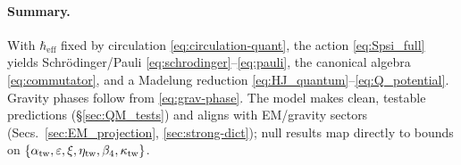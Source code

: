 \paragraph{Summary.}
With \(\hbar_{\mathrm{eff}}\) fixed by circulation \eqref{eq:circulation-quant}, the action \eqref{eq:Spsi_full} yields Schr\"odinger/Pauli \eqref{eq:schrodinger}--\eqref{eq:pauli}, the canonical algebra \eqref{eq:commutator}, and a Madelung reduction \eqref{eq:HJ_quantum}--\eqref{eq:Q_potential}. Gravity phases follow from \eqref{eq:grav-phase}. The model makes clean, testable predictions (\S\ref{sec:QM_tests}) and aligns with EM/gravity sectors (Secs.~\ref{sec:EM_projection}, \ref{sec:strong-dict}); null results map directly to bounds on \(\{\alpha_{\rm tw},\varepsilon,\xi,\eta_{\rm tw},\beta_4,\kappa_{\rm tw}\}\).
